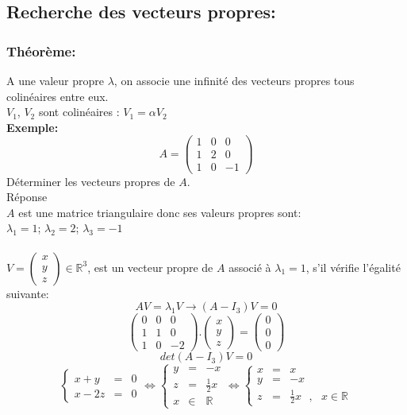 \documentclass[a4paper,12pt,french]{article}
\begin{document}
\subsection{Recherche des vecteurs propres:}
\subsubsection{Théorème:}
A une valeur propre $\lambda$, on associe une infinité des vecteurs propres tous colinéaires entre eux.\\ $V_{1}$, $V_{2}$ sont colinéaires : $V_{1}=\alpha V_{2}$\\
\textbf{Exemple:}
\[A=\begin{pmatrix}
	1 & 0 & 0  \\
	1 & 2 & 0 \\
	1 & 0 & -1

\end{pmatrix}\] 
Déterminer les vecteurs propres de $A$.\\
Réponse\\
$A$ est une matrice triangulaire donc ses valeurs propres sont:\\
$\lambda_{1}=1$; $\lambda_{2}=2$; $\lambda_{3}=-1$\\\\
$V=\begin{pmatrix}
	x  \\
	y  \\
	z
	
\end{pmatrix} \in \mathbb{R}^{3}$, est un vecteur propre de $A$ associé à $\lambda_{1}=1$, s'il vérifie l'égalité suivante:\\
\[AV=\lambda_{1}V \rightarrow (A-I_{3})V=0\] 
\[\begin{pmatrix}
	0 & 0 & 0  \\
	1 & 1 & 0 \\
	1 & 0 & -2
	
\end{pmatrix}.\begin{pmatrix}
	x   \\
	y   \\
	z 
	
\end{pmatrix}=\begin{pmatrix}
0   \\
0  \\
0 

\end{pmatrix}\] 
\[det(A-I_{3})V=0\]
\[\left \{
\begin{array}{rcl}
	x+y&=&0 \\
	x-2z&=&0
\end{array}
\right. \Leftrightarrow \left \{
\begin{array}{rcl}
	y&=&-x \\
	z&=&\frac{1}{2}x\\
	x& \in& \mathbb{R}
\end{array}
\right.\Leftrightarrow \left \{
\begin{array}{rcl}
	x&=&x \\
	y&=&-x\\
	z&=&\frac{1}{2}x ~~~,~~~x \in \mathbb{R}
	
\end{array}
\right.\]
\end{document}

